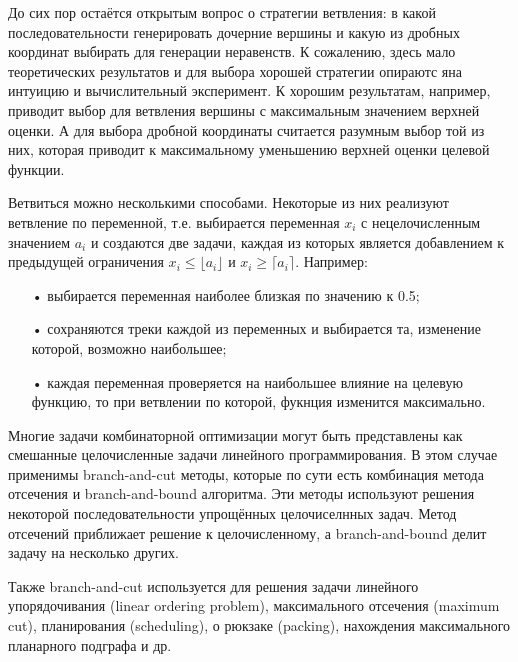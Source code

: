 \documentclass[a4paper,14pt,russian]{extreport}
\begin{document}
\par
До сих пор остаётся открытым вопрос о стратегии ветвления: в какой последовательности генерировать дочерние вершины и какую из дробных координат выбирать для генерации неравенств. К сожалению, здесь мало теоретических результатов и для выбора хорошей стратегии опираютс яна интуицию и вычислительный эксперимент. К хорошим результатам, например, приводит выбор для ветвления вершины с максимальным значением верхней оценки. А для выбора дробной координаты считается разумным выбор той из них, которая приводит к максимальному уменьшению верхней оценки целевой функции. 
\par
Ветвиться можно несколькими способами. Некоторые из них реализуют ветвление по переменной, т.е. выбирается переменная $x_i$ с нецелочисленным значением $a_i$ и создаются две задачи, каждая из которых является добавлением к предыдущей ограничения $x_i\leqslant \lfloor a_i \rfloor$ и $x_i\geqslant \lceil a_i \rceil$. Например:
\begin{itemize}
\item[•] выбирается переменная наиболее близкая по значению к 0.5;
\item[•] сохраняются треки каждой из переменных и выбирается та, изменение которой, возможно наибольшее;
\item[•] каждая переменная проверяется на наибольшее влияние на целевую функцию, то при ветвлении по которой, фукнция изменится максимально.
\end{itemize}
\par

\par
Многие задачи комбинаторной оптимизации могут быть представлены как смешанные целочисленные задачи линейного программирования. В этом случае применимы branch-and-cut методы, которые по сути есть комбинация метода отсечения и branch-and-bound алгоритма. Эти методы используют решения некоторой последовательности упрощённых целочиселнных задач. Метод отсечений приближает решение к целочисленному, а branch-and-bound делит задачу на несколько других. 
\par

\par
Также branch-and-cut используется для решения задачи линейного упорядочивания (linear ordering problem), максимального отсечения (maximum cut), планирования (scheduling), о рюкзаке (packing), нахождения максимального планарного подграфа и др.
\par
\end{document}
